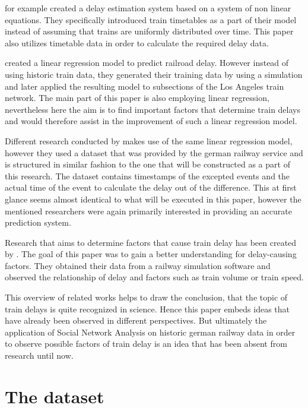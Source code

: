 \documentclass[12pt,a4paper]{article}
\begin{document}
\cite{Cheng90} for example created a delay estimation system based on a system of non linear equations. 
They specifically introduced train timetables as a part of their model instead of assuming that trains are uniformly distributed over time. 
This paper also utilizes timetable data in order to calculate the required delay data.

\cite{Murali2010} created a linear regression model to predict railroad delay. 
However instead of using historic train data, they generated their training data by using a simulation and later applied the resulting model to subsections of the Los Angeles train network. 
The main part of this paper is also employing linear regression, nevertheless here the aim is to find important factors that determine train delays and would therefore assist in the improvement of such a linear regression model.

Different research conducted by \cite{Hauck2020} makes use of the same linear regression model, however they used a dataset that was provided by the german railway service and is structured in similar fashion to the one that will be constructed as a part of this research. 
The dataset contains timestamps of the excepted events and the actual time of the event to calculate the delay out of the difference. This at first glance seems almost identical to what will be executed in this paper, however the mentioned researchers were again primarily interested in providing an accurate prediction system.

Research that aims to determine factors that cause train delay has been created by \cite{Dingler2010}. The goal of this paper was to gain a better understanding for delay-causing factors. 
They obtained their data from a railway simulation software and observed the relationship of delay and factors such as train volume or train speed.

This overview of related works helps to draw the conclusion, that the topic of train delays is quite recognized in science.
Hence this paper embeds ideas that have already been observed in different perspectives. 
But ultimately the application of Social Network Analysis on historic german railway data in order to observe possible factors of train delay is an idea that has been absent from research until now.  

\maketitle
\section{\label{sec:Dataset}The dataset}
\end{document}
